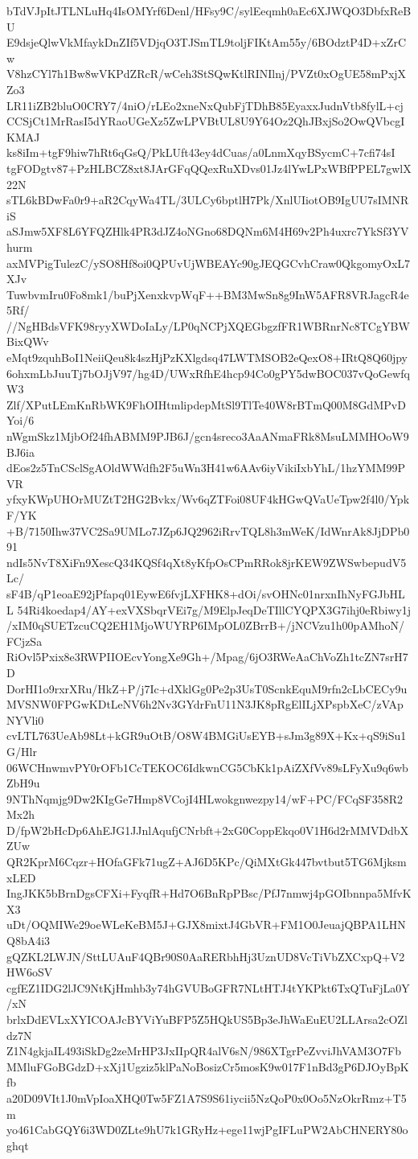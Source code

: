 bTdVJpItJTLNLuHq4IsOMYrf6Denl/HFsy9C/sylEeqmh0aEc6XJWQO3DbfxReBU
E9dsjeQlwVkMfaykDnZIf5VDjqO3TJSmTL9toljFIKtAm55y/6BOdztP4D+xZrCw
V8hzCYl7h1Bw8wVKPdZRcR/wCeh3StSQwKtlRINIlnj/PVZt0xOgUE58mPxjXZo3
LR11iZB2bluO0CRY7/4niO/rLEo2xneNxQubFjTDhB85EyaxxJudnVtb8fylL+cj
CCSjCt1MrRasI5dYRaoUGeXz5ZwLPVBtUL8U9Y64Oz2QhJBxjSo2OwQVbcgIKMAJ
ks8iIm+tgF9hiw7hRt6qGsQ/PkLUft43ey4dCuas/a0LnmXqyBSycmC+7cfi74sI
tgFODgtv87+PzHLBCZ8xt8JArGFqQQexRuXDvs01Jz4lYwLPxWBfPPEL7gwlX22N
sTL6kBDwFa0r9+aR2CqyWa4TL/3ULCy6bptlH7Pk/XnlUIiotOB9IgUU7sIMNRiS
aSJmw5XF8L6YFQZHlk4PR3dJZ4oNGno68DQNm6M4H69v2Ph4uxrc7YkSf3YVhurm
axMVPigTulezC/ySO8Hf8oi0QPUvUjWBEAYc90gJEQGCvhCraw0QkgomyOxL7XJv
TuwbvmIru0Fo8mk1/buPjXenxkvpWqF++BM3MwSn8g9InW5AFR8VRJagcR4e5Rf/
//NgHBdsVFK98ryyXWDoIaLy/LP0qNCPjXQEGbgzfFR1WBRnrNc8TCgYBWBixQWv
eMqt9zquhBoI1NeiiQeu8k4szHjPzKXlgdsq47LWTMSOB2eQexO8+IRtQ8Q60jpy
6ohxmLbJuuTj7bOJjV97/hg4D/UWxRfhE4hcp94Co0gPY5dwBOC037vQoGewfqW3
Zlf/XPutLEmKnRbWK9FhOIHtmlipdepMtSl9TlTe40W8rBTmQ00M8GdMPvDYoi/6
nWgmSkz1MjbOf24fhABMM9PJB6J/gcn4sreco3AaANmaFRk8MsuLMMHOoW9BJ6ia
dEos2z5TnCSclSgAOldWWdfh2F5uWn3H41w6AAv6iyVikiIxbYhL/1hzYMM99PVR
yfxyKWpUHOrMUZtT2HG2Bvkx/Wv6qZTFoi08UF4kHGwQVaUeTpw2f4l0/YpkF/YK
+B/7150Ihw37VC2Sa9UMLo7JZp6JQ2962iRrvTQL8h3mWeK/IdWnrAk8JjDPb091
ndIs5NvT8XiFn9XescQ34KQSf4qXt8yKfpOsCPmRRok8jrKEW9ZWSwbepudV5Lc/
sF4B/qP1eoaE92jPfapq01EywE6fvjLXFHK8+dOi/svOHNc01nrxnIhNyFGJbHLL
54Ri4koedap4/AY+exVXSbqrVEi7g/M9ElpJeqDeTIllCYQPX3G7ihj0eRbiwy1j
/xIM0qSUETzcuCQ2EH1MjoWUYRP6IMpOL0ZBrrB+/jNCVzu1h00pAMhoN/FCjzSa
RiOvl5Pxix8e3RWPIIOEcvYongXe9Gh+/Mpag/6jO3RWeAaChVoZh1tcZN7srH7D
DorHI1o9rxrXRu/HkZ+P/j7Ic+dXklGg0Pe2p3UsT0ScnkEquM9rfn2cLbCECy9u
MVSNW0FPGwKDtLeNV6h2Nv3GYdrFnU11N3JK8pRgElILjXPspbXeC/zVApNYVli0
cvLTL763UeAb98Lt+kGR9uOtB/O8W4BMGiUsEYB+sJm3g89X+Kx+qS9iSu1G/Hlr
06WCHnwmvPY0rOFb1CcTEKOC6IdkwnCG5CbKk1pAiZXfVv89sLFyXu9q6wbZbH9u
9NThNqmjg9Dw2KIgGe7Hmp8VCojI4HLwokgnwezpy14/wF+PC/FCqSF358R2Mx2h
D/fpW2bHcDp6AhEJG1JJnlAqufjCNrbft+2xG0CoppEkqo0V1H6d2rMMVDdbXZUw
QR2KprM6Cqzr+HOfaGFk71ugZ+AJ6D5KPc/QiMXtGk447bvtbut5TG6MjksmxLED
IngJKK5bBrnDgsCFXi+FyqfR+Hd7O6BnRpPBsc/PfJ7nmwj4pGOIbnnpa5MfvKX3
uDt/OQMIWe29oeWLeKeBM5J+GJX8mixtJ4GbVR+FM1O0JeuajQBPA1LHNQ8bA4i3
gQZKL2LWJN/SttLUAuF4QBr90S0AaRERbhHj3UznUD8VcTiVbZXCxpQ+V2HW6oSV
cgfEZ1IDG2lJC9NtKjHmhb3y74hGVUBoGFR7NLtHTJ4tYKPkt6TxQTuFjLa0Y/xN
brlxDdEVLxXYICOAJcBYViYuBFP5Z5HQkUS5Bp3eJhWaEuEU2LLArsa2cOZldz7N
Z1N4gkjaIL493iSkDg2zeMrHP3JxIIpQR4alV6sN/986XTgrPeZvviJhVAM3O7Fb
MMluFGoBGdzD+xXj1Ugziz5klPaNoBosizCr5mosK9w017F1nBd3gP6DJOyBpKfb
a20D09VIt1J0mVpIoaXHQ0Tw5FZ1A7S9S61iycii5NzQoP0x0Oo5NzOkrRmz+T5m
yo461CabGQY6i3WD0ZLte9hU7k1GRyHz+ege11wjPgIFLuPW2AbCHNERY80oghqt
